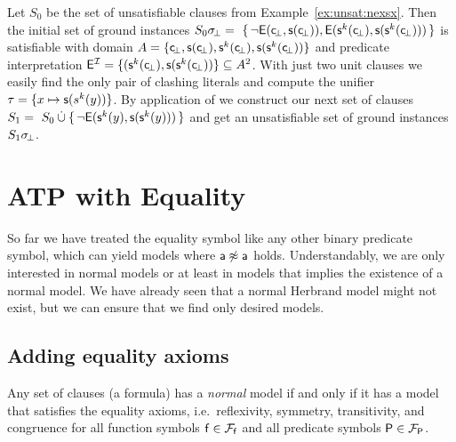 \begin{example}\label{ex:unsat2}
Let \( S_0 \) be the set of unsatisfiable clauses
from Example~\ref{ex:unsat:nexsx}.
Then the initial set of ground instances
\( S_0\sigma \!_\bot =\
 \{ \,
{ \lnot\mathsf{E}(\mathsf{c} \!_\bot, \mathsf{s}(\mathsf{c} \!_\bot)) },
{ \mathsf{E}(\mathsf{s}^k(\mathsf{c} \!_\bot), \mathsf{s}(\mathsf{s}^k(\mathsf{c} \!_\bot)))}
 \, \} \)
is satisfiable with domain
\( A = \{ \mathsf{c} \!_\bot, \mathsf{s}(\mathsf{c} \!_\bot), \mathsf{s}^k(\mathsf{c} \!_\bot), \mathsf{s}(\mathsf{s}^k(\mathsf{c} \!_\bot)) \} \)
and predicate interpretation
\( \mathsf{E}^{\mathcal{I}} = \{ (\mathsf{s}^k(\mathsf{c} \!_\bot), \mathsf{s}(\mathsf{s}^k(\mathsf{c} \!_\bot)) \} \subseteq A^2 \).
%
 With just two unit clauses we easily find the only pair of clashing literals and compute the unifier
 \( \tau = \{ x\mapsto \mathsf{s}(s^k(y)) \} \).
 By application of \InstGen{} we construct our next set of clauses
\( S_1 =\
S_0 \mathbin{\dot\cup}
 \{ \,
 { \lnot\mathsf{E}(\mathsf{s}^k(y), \mathsf{s}(\mathsf{s}^k(y)))}
 \, \}
 \)
 and get an unsatisfiable set of ground instances \( S_1\sigma \!_\bot \).
\end{example}




\section{ATP with Equality}\label{sec:proving:with:equality}

So far we have treated the equality symbol like any other binary predicate symbol,
which can yield models where \( \mathsf{a}\not\approx\mathsf{a} \) holds.
Understandably, we are only interested in normal models or
at least in models that implies the existence of a normal model.
We have already seen that a normal Herbrand model might not exist,
but we can ensure that we find only desired models.

\subsection{Adding equality axioms}\label{sec:equality:axioms}

\begin{theorem}\cite{Harrison:2009:HPL:1540610}
	Any set of clauses (a formula) has a \emph{normal} model
	if and only if it has a model that satisfies the
	{ \coloremph{}equality axioms}, i.e.~reflexivity, symmetry, transitivity,
	and congruence for all function symbols \( \mathsf{f}\in{\mathcal{F}_{\mathsf{f}}} \)
	and all predicate symbols \( \mathsf{P}\in{\mathcal{F}_{\mathsf{P}}} \).
\end{theorem}


